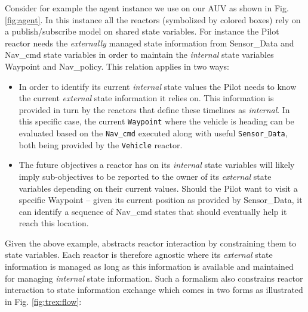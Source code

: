Consider for example the \rx agent instance we use on our AUV as shown
in Fig. \ref{fig:agent}. In this instance all the reactors (symbolized
by colored boxes) %
rely on a publish/subscribe model on shared state variables. For
instance the \textsf{Pilot} reactor needs the {\em externally} managed
state information from \textsf{Sensor\_Data} and \textsf{Nav\_cmd}
state variables in order to maintain the \emph{internal} state
variables \textsf{Waypoint} and \textsf{Nav\_policy}. This relation
applies in two ways:

\begin{itemize}

\item In order to identify its current {\em internal} state values the
  \textsf{Pilot} needs to know the current {\em external} state
  information it relies on. This information is provided in turn by
  the reactors that define these timelines as {\em internal}. In this
  specific case, the current \texttt{Waypoint} where the vehicle is
  heading can be evaluated based on the \texttt{Nav\_cmd} executed
  along with useful \texttt{Sensor\_Data}, both being provided by the
  \texttt{Vehicle} reactor.

\item The future objectives a reactor has on its \emph{internal} state
  variables will likely imply sub-objectives to be reported to the
  owner of its {\em external} state variables depending on their
  current values. Should the \textsf{Pilot} want to visit a specific
  \textsf{Waypoint} -- given its current position as provided by
  \textsf{Sensor\_Data}, it can identify a sequence of
  \textsf{Nav\_cmd} states that should eventually help it reach this
  location. 

\end{itemize}

Given the above example, \rx abstracts reactor interaction by
constraining them to state variables. Each reactor is therefore
agnostic where its {\em external} state information is managed as long
as this information is available and maintained for managing {\em
  internal} state information.  Such a formalism also constrains
reactor interaction to state information exchange which comes in two
forms as illustrated in Fig. \ref{fig:trex:flow}:

